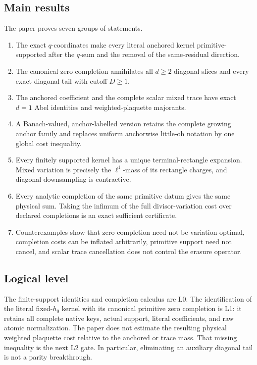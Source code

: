 \subsection{Main results}

The paper proves seven groups of statements.
\begin{enumerate}[label=\textup{(\arabic*)},leftmargin=3em]
 \item The exact \(q\)-coordinates make every literal anchored kernel
       primitive-supported after the \(q\)-sum and the removal of the
       same-residual direction.
 \item The canonical zero completion annihilates all \(d\ge2\) diagonal
       slices and every exact diagonal tail with cutoff \(D\ge1\).
 \item The anchored coefficient and the complete scalar mixed trace have
       exact \(d=1\) Abel identities and weighted-plaquette majorants.
 \item A Banach-valued, anchor-labelled version retains the complete
       growing anchor family and replaces uniform anchorwise little-oh
       notation by one global cost inequality.
 \item Every finitely supported kernel has a unique terminal-rectangle
       expansion.  Mixed variation is precisely the \(\ell^1\)-mass of
       its rectangle charges, and diagonal downsampling is contractive.
 \item Every analytic completion of the same primitive datum gives the
       same physical sum.  Taking the infimum of the full divisor-variation
       cost over declared completions is an exact sufficient certificate.
 \item Counterexamples show that zero completion need not be
       variation-optimal, completion costs can be inflated arbitrarily,
       primitive support need not cancel, and scalar trace cancellation
       does not control the erasure operator.
\end{enumerate}

\subsection{Logical level}

The finite-support identities and completion calculus are L0.  The
identification of the literal fixed-\(h_0\) kernel with its canonical
primitive zero completion is L1: it retains all complete native keys,
actual support, literal coefficients, and raw atomic normalization.  The
paper does not estimate the resulting physical weighted plaquette cost
relative to the anchored or trace mass.  That missing inequality is the
next L2 gate.  In particular, eliminating an auxiliary diagonal tail is
not a parity breakthrough.

